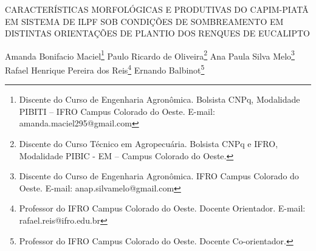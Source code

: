 \documentclass[article,12pt,onesidea,4paper,english,brazil]{abntex2}
\begin{document}
	
	
	\frenchspacing 
	
	\begin{center}
		\LARGE CARACTERÍSTICAS MORFOLÓGICAS E PRODUTIVAS DO CAPIM-PIATÃ EM
		SISTEMA DE ILPF SOB CONDIÇÕES DE SOMBREAMENTO EM DISTINTAS
		ORIENTAÇÕES DE PLANTIO DOS RENQUES DE EUCALIPTO
		
		\normalsize
		Amanda Bonifacio Maciel\footnote{Discente do Curso de Engenharia Agronômica. Bolsista CNPq, Modalidade PIBITI – IFRO Campus Colorado do Oeste. E-mail: amanda.maciel295@gmail.com} 
		Paulo Ricardo de Oliveira\footnote{Discente do Curso Técnico em Agropecuária. Bolsista CNPq e IFRO, Modalidade PIBIC - EM – Campus Colorado do Oeste.} 
		Ana Paula Silva Melo\footnote{Discente do Curso de Engenharia Agronômica. IFRO Campus Colorado do Oeste. E-mail: anap.silvamelo@gmail.com} 
		Rafael Henrique Pereira dos Reis\footnote{Professor do IFRO Campus Colorado do Oeste. Docente Orientador. E-mail: rafael.reis@ifro.edu.br}
		Ernando Balbinot\footnote{Professor do IFRO Campus Colorado do Oeste. Docente Co-orientador.} 
	\end{center}
	
\end{document}
